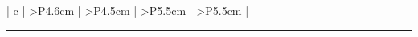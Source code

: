 \documentclass[a0,portrait]{a0poster}
\begin{document}
\begin{multicols}{3}
\begin{tabular}{| c | >{}P{4.6cm} | >{}P{4.5cm} | >{}P{5.5cm} | >{}P{5.5cm} |}
    \specialrule{1.7pt}{1pt}{1pt}
         
\end{tabular}

\bigskip

\noindent\rule[0.5ex]{\linewidth}{1pt}



\color{SaddleBrown} %








\end{multicols}
\end{document}
